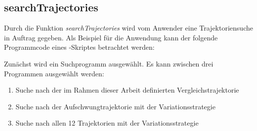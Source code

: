 \subsection{searchTrajectories}\label{subsec:searchtrj}

Durch die Funktion \textit{searchTrajectories} wird vom Anwender eine Trajektoriensuche in Auftrag gegeben. Als Beispiel für die Anwendung kann der folgende Programmcode eines \Matlab-Skriptes betrachtet werden:



Zunächst wird ein Suchprogramm ausgewählt. Es kann zwischen drei Programmen ausgewählt werden:

\begin{enumerate}
	\item Suche nach der im Rahmen dieser Arbeit definierten Vergleichstrajektorie
	\item Suche nach der Aufschwungtrajektorie mit der Variationsstrategie
	\item Suche nach allen 12 Trajektorien mit der Variationsstrategie
\end{enumerate}

